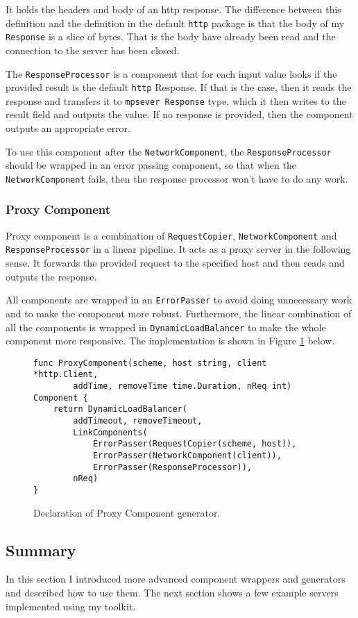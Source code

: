 It holds the headers and body of an http response. The difference between
this definition and the definition in the default \texttt{http} package is that
the body of my \texttt{Response} is a slice of bytes. 
That is the body have already been
read and the connection to the server has been closed.

The \texttt{ResponseProcessor} is a component that for each input value
looks if the provided result is the default \texttt{http} Response. 
If that is the case,
then it reads the response and transfers it to \texttt{mpsever Response} 
type, which it
then writes to the result field and outputs the value. If no response
is provided, then the component outputs an appropriate error.

To use this component after the \texttt{NetworkComponent}, 
the \texttt{ResponseProcessor}
should be wrapped in an error passing component, so that when the\\
\texttt{NetworkComponent} fails, then the response processor won't have to do
any work.

\subsubsection{Proxy Component}
Proxy component is a combination of \texttt{RequestCopier}, 
\texttt{NetworkComponent} 
and \texttt{ResponseProcessor} in a linear pipeline. It acts as a proxy server
in the following sense. It forwards the provided request to the specified
host and then reads and outputs the response. 

All components are wrapped
in an \texttt{ErrorPasser} to avoid doing unnecessary work and to make the component
more robust. Furthermore, the linear combination of all the components is wrapped in 
\texttt{DynamicLoadBalancer} to make the whole component more 
responsive. The implementation is shown in Figure \ref{fig:ProxyComp} below.

\begin{figure}[h]
\centering
\begin{lstlisting}
func ProxyComponent(scheme, host string, client *http.Client, 
        addTime, removeTime time.Duration, nReq int) Component {
    return DynamicLoadBalancer(
        addTimeout, removeTimeout,
        LinkComponents(
            ErrorPasser(RequestCopier(scheme, host)),
            ErrorPasser(NetworkComponent(client)),
            ErrorPasser(ResponseProcessor)),
        nReq)
}
\end{lstlisting}
\caption[scale=1.0]{Declaration of Proxy Component generator.}
\label{fig:ProxyComp}
\end{figure}
\subsection{Summary}
In this section I introduced more advanced component wrappers and generators
and described how to use them. The next section shows a few example
servers implemented using my toolkit.

